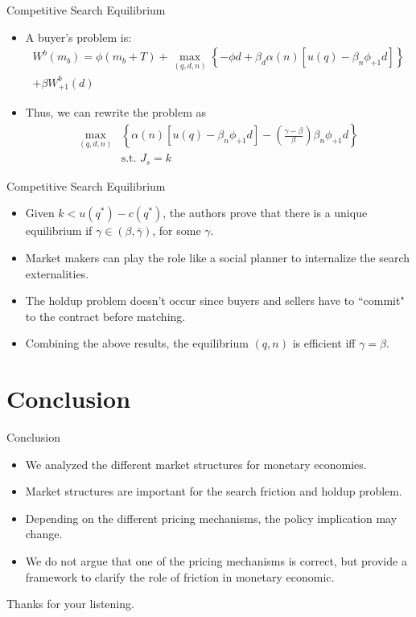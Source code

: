 \documentclass{beamer}
\begin{document}
\begin{frame}{Competitive Search Equilibrium}
    \begin{itemize}
               \item A buyer's problem is:
        \begin{align*}
            W^{b}(m_{b}) = \phi (m_{b}+T) + \max_{(q,d,n)}\left\{-\phi d+\beta_{d}\alpha(n)\left[u(q)-\beta_{n}\phi_{+1}d\right]\right\}\\+\beta W_{+1}^{b}(d) 
            \end{align*}
            \item Thus, we can rewrite the problem as
            \begin{align*}
            \max_{(q,d,n)} &\left\{\alpha(n)\left[u(q)-\beta_{n}\phi_{+1}d\right]-(\frac{\gamma-\beta}{\beta})\beta_{n}\phi_{+1}d\right\}\\
            &\text{s.t. }J_{s} = k
        \end{align*}
    \end{itemize}
\end{frame}

\begin{frame}{Competitive Search Equilibrium}
    \begin{itemize}
        \item Given $k<u(q^{*})-c(q^{*})$, the authors prove that there is a unique equilibrium if $\gamma \in (\beta,\bar{\gamma})$, for some $\gamma$.
        \item Market makers can play the role like a social planner to internalize the search externalities.
        \item  The holdup problem doesn't occur since buyers and sellers have to ``commit" to the contract before matching.
        \item Combining the above results, the equilibrium $(q,n) $ is efficient iff $\gamma=\beta$.
        
    \end{itemize}
\end{frame}
\section{Conclusion}
\begin{frame}{Conclusion}
    \begin{itemize}
        \item We analyzed the different market structures for monetary economies. 
        \item Market structures are important for the search friction and holdup problem.
        \item Depending on the different pricing mechanisms, the policy implication may change.
        \item We do not argue that one of the pricing mechanisms is correct, but provide a framework to clarify the role of friction in monetary economic.
    \end{itemize}
\end{frame}

\begin{frame}
    \centering
    \Large
    Thanks for your listening.
\end{frame}
\end{document}

